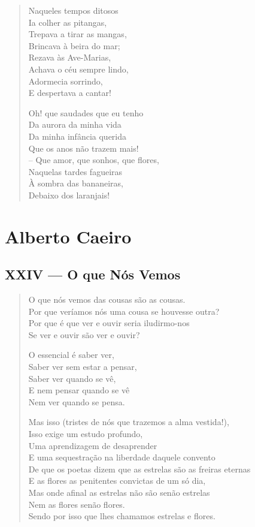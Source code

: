 \documentclass[10pt,a5paper,oneside]{book}
\begin{document}
\begin{verse}
Naqueles tempos ditosos\\
Ia colher as pitangas,\\
Trepava a tirar as mangas,\\
Brincava à beira do mar;\\
Rezava às Ave-Marias,\\
Achava o céu sempre lindo,\\
Adormecia sorrindo,\\
E despertava a cantar!

Oh! que saudades que eu tenho\\
Da aurora da minha vida\\
Da minha infância querida\\
Que os anos não trazem mais!\\
-- Que amor, que sonhos, que flores,\\
Naquelas tardes fagueiras\\
À sombra das bananeiras,\\
Debaixo dos laranjais!
\end{verse}

\part{Alberto Caeiro}

\chapter{XXIV --- O que Nós Vemos}

\begin{verse}
O que nós vemos das cousas são as cousas.\\
Por que veríamos nós uma cousa se houvesse outra?\\
Por que é que ver e ouvir seria iludirmo-nos\\
Se ver e ouvir são ver e ouvir?

O essencial é saber ver,\\
Saber ver sem estar a pensar,\\
Saber ver quando se vê,\\
E nem pensar quando se vê\\
Nem ver quando se pensa.

Mas isso (tristes de nós que trazemos a alma vestida!),\\
Isso exige um estudo profundo,\\
Uma aprendizagem de desaprender\\
E uma sequestração na liberdade daquele convento\\
De que os poetas dizem que as estrelas são as freiras eternas\\
E as flores as penitentes convictas de um só dia,\\
Mas onde afinal as estrelas não são senão estrelas\\
Nem as flores senão flores.\\
Sendo por isso que lhes chamamos estrelas e flores.
\end{verse}
\end{document}
